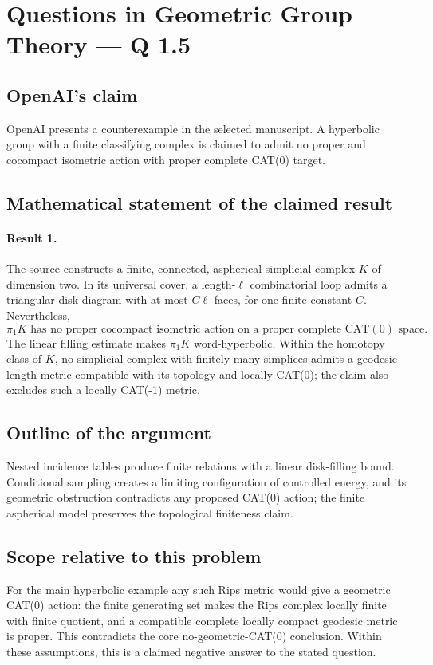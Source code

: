 \documentclass[11pt]{article}
\begin{document}
\section*{Questions in Geometric Group Theory — Q 1.5}

\subsection{OpenAI's claim}
OpenAI presents a counterexample in the selected manuscript. A hyperbolic group with a finite classifying complex is claimed to admit no proper and cocompact isometric action with proper complete CAT(0) target.

\subsection{Mathematical statement of the claimed result}
\paragraph{Result 1.} The source constructs a finite, connected, aspherical simplicial complex \(K\) of dimension two. In its universal cover, a length-\(\ell\) combinatorial loop admits a triangular disk diagram with at most \(C\ell\) faces, for one finite constant \(C\). Nevertheless,
\[
 \pi_1K\text{ has no proper cocompact isometric action on a proper complete CAT}(0)\text{ space}.
\]
The linear filling estimate makes \(\pi_1K\) word-hyperbolic. Within the homotopy class of \(K\), no simplicial complex with finitely many simplices admits a geodesic length metric compatible with its topology and locally CAT(0); the claim also excludes such a locally CAT(-1) metric.

\subsection{Outline of the argument}
Nested incidence tables produce finite relations with a linear disk-filling bound. Conditional sampling creates a limiting configuration of controlled energy, and its geometric obstruction contradicts any proposed CAT(0) action; the finite aspherical model preserves the topological finiteness claim.

\subsection{Scope relative to this problem}
For the main hyperbolic example any such Rips metric would give a geometric CAT(0) action: the finite generating set makes the Rips complex locally finite with finite quotient, and a compatible complete locally compact geodesic metric is proper. This contradicts the core no-geometric-CAT(0) conclusion. Within these assumptions, this is a claimed negative answer to the stated question.
\end{document}
